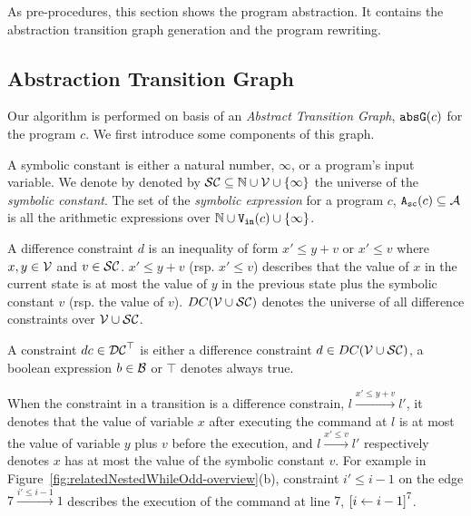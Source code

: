 As pre-procedures, this section shows the program abstraction. 
It contains the abstraction transition graph generation
and the program rewriting. 

\subsection{Abstraction Transition Graph}
Our algorithm
is performed on basis of an \emph{Abstract Transition Graph}, $\mathtt{abs}{\mathtt{G}}(c)$
for the program $c$.
We first introduce some components of this graph.
\begin{defn}
 \label{def:symbolic_expr}
A symbolic constant is either a natural number, $\infty$, or a program's input variable. We denote by denoted by $\mathcal{SC} \subseteq \mathbb{N} \cup \mathcal{V} \cup \{\infty \}$ the universe of the \emph{symbolic constant}.
 The set of the \emph{symbolic expression} for a program $c$, ${\mathtt{A_{sc}}}(c) \subseteq \mathcal{A}$ is all the arithmetic expressions over $\mathbb{N} \cup {\ensuremath{\mathtt{V_{\mathtt{in}}}}}(c) \cup \{\infty \}$.
\end{defn}

\begin{defn}
A difference constraint $d$ is an inequality of
form $x' \leq y + v$ or $x' \leq v$ where $x, y \in \mathcal{V} $ and $v \in \mathcal{SC}$.
$x' \leq y + v$ (rsp. $x' \leq v$) describes that the value of $x$ in the current state is
at most the value of $y$ in the previous state plus the symbolic constant $v$ (rsp. the value of $v$).
$DC(\mathcal{V} \cup \mathcal{SC})$ denotes the universe of all difference constraints over $\mathcal{V} \cup \mathcal{SC}$.
\end{defn}

\begin{defn}[Constraints]
A constraint $dc \in \mathcal{DC}^{\top}$
is either a
difference constraint $d \in DC(\mathcal{V} \cup \mathcal{SC})$, a boolean expression $b \in \mathcal{B}$
or $\top$ denotes always true.
\end{defn}

When the constraint in a transition is a difference constrain, $l \xrightarrow{x' \leq y + v} l'$,
it denotes that
the value of variable $x$
after executing the command at $l$ is at most
the value of variable $y$ plus $v$ before the execution,
and $l \xrightarrow{x' \leq v} l'$ respectively denotes
$x$ has at most
the value of the symbolic constant $v$.
For example in Figure~\ref{fig:relatedNestedWhileOdd-overview}(b), constraint $i' \leq i - 1$ on the edge $7 \xrightarrow{i' \leq i - 1} 1$
describes the execution of
 the command at line $7$, 
$\clabel{\assign{i}{i - 1}}^{7}$. 

